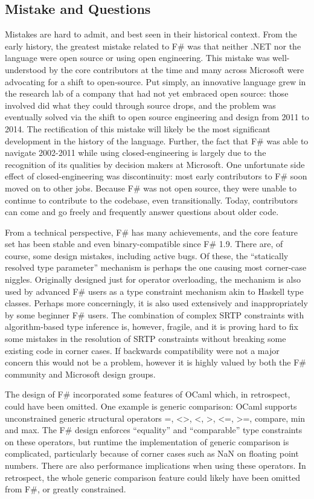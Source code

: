 \documentclass[acmsmall,review]{acmart}\settopmatter{printfolios=true,printccs=false,printacmref=false}
\begin{document}
\subsection*{Mistake and Questions}

Mistakes are hard to admit, and best seen in their historical context.  From the early history, the greatest mistake related to F\# was that neither .NET nor the language were open source or using open engineering.  This mistake was well-understood by the core contributors at the time and many across Microsoft were advocating for a shift to open-source. Put simply, an innovative language grew in the research lab of a company that had not yet embraced open source: those involved did what they could through source drops, and the problem was eventually solved via the shift to open source engineering and design from 2011 to 2014. The rectification of this mistake will likely be the most significant development in the history of the language. Further, the fact that F\# was able to navigate 2002-2011 while using closed-engineering is largely due to the recognition of its qualities by decision makers at Microsoft.
One unfortunate side effect of closed-engineering was discontinuity: most early contributors to F\# soon moved on to other jobs. Because F\# was not open source, they were unable to continue to contribute to the codebase, even transitionally. Today, contributors can come and go freely and frequently answer questions about older code.

From a technical perspective, F\# has many achievements, and the core feature set has been stable and even binary-compatible since F\# 1.9.  There are, of course, some design mistakes, including active bugs.  Of these, the “statically resolved type parameter” mechanism is perhaps the one causing most corner-case niggles. Originally designed just for operator overloading, the mechanism is also used by advanced F\# users as a type constraint mechanism akin to Haskell type classes. Perhaps more concerningly, it is also used extensively and inappropriately by some beginner F\# users.   The combination of complex SRTP constraints with algorithm-based type inference is, however, fragile, and it is proving hard to fix some mistakes in the resolution of SRTP constraints without breaking some existing code in corner cases.  If backwards compatibility were not a major concern this would not be a problem, however it is highly valued by both the F\# community and Microsoft design groups.

The design of F\# incorporated some features of OCaml which, in retrospect, could have been omitted.  One example is generic comparison: OCaml supports unconstrained generic structural operators =, <>, <, >, <=, >=, compare, min and max.  The F\# design enforces “equality” and “comparable” type constraints on these operators, but runtime the implementation of generic comparison is complicated, particularly because of corner cases such as NaN on floating point numbers. There are also performance implications when using these operators. In retrospect, the whole generic comparison feature could likely have been omitted from F\#, or greatly constrained.
\end{document}
